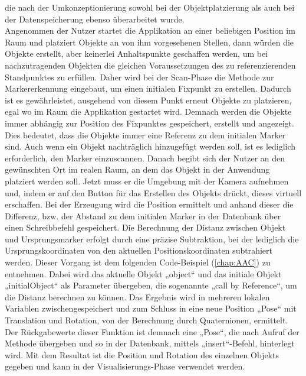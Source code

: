 die nach der Umkonzeptionierung sowohl bei der Objektplatzierung als auch bei der Datenspeicherung ebenso überarbeitet wurde. 
\\ 
\linebreak
Angenommen der Nutzer startet die Applikation an einer beliebigen Position im Raum und platziert Objekte an von ihm vorgesehenen Stellen, dann würden die 
Objekte erstellt, aber keinerlei Anhaltspunkte geschaffen werden, um bei nachzutragenden Objekten die gleichen Voraussetzungen des zu referenzierenden Standpunktes 
zu erfüllen. Daher wird bei der Scan-Phase die Methode zur Markererkennung eingebaut, um einen initialen Fixpunkt zu erstellen. Dadurch ist es gewährleistet, 
ausgehend von diesem Punkt erneut Objekte zu platzieren, egal wo im Raum die Applikation gestartet wird. Demnach werden die Objekte immer abhängig zur Position des 
Fixpunktes gespeichert, erstellt und angezeigt. Dies bedeutet, dass die Objekte immer eine Referenz zu dem initialen Marker sind. Auch wenn 
ein Objekt nachträglich hinzugefügt werden soll, ist es lediglich erforderlich, den Marker einzuscannen. Danach begibt sich der Nutzer an den gewünschten Ort im 
realen Raum, an dem das Objekt in der Anwendung platziert werden soll. Jetzt muss er die Umgebung mit der Kamera aufnehmen und, indem er auf den Button für das 
Erstellen des Objekts drückt, dieses virtuell erschaffen. Bei der Erzeugung wird die Position ermittelt und anhand dieser die Differenz, bzw. der 
Abstand zu dem initialen Marker in der Datenbank über einen Schreibbefehl gespeichert. Die Berechnung der Distanz zwischen Objekt und 
Ursprungsmarker erfolgt durch eine präzise Subtraktion, bei der lediglich die Ursprungskoordinaten von den aktuellen Positionskoordinaten subtrahiert werden. 
Dieser Vorgang ist dem folgenden Code-Beispiel (\ref{chap:AAC}) zu entnehmen. Dabei wird das aktuelle Objekt „object“ und das initiale Objekt „initialObject“ 
als Parameter übergeben, die sogenannte „call by Reference“, um die Distanz berechnen zu können. Das Ergebnis wird in mehreren lokalen Variablen 
zwischengespeichert und zum Schluss in eine neue Position „Pose“ mit Translation und Rotation, von der Berechnung durch Quaternionen, ermittelt. Der Rückgabewerte 
dieser Funktion ist demnach eine „Pose“, die nach Aufruf der Methode übergeben und so in der Datenbank, mittels „insert“-Befehl, hinterlegt wird. Mit dem 
Resultat ist die Position und Rotation des einzelnen Objekts gegeben und kann in der Visualisierungs-Phase verwendet werden.
\\
\linebreak
